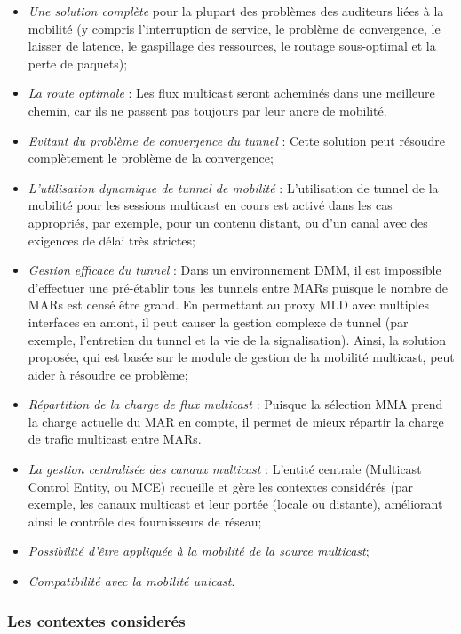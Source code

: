 \begin{itemize}
\item \textit{Une solution complète} pour la plupart des problèmes des auditeurs liées à la mobilité (y compris l'interruption de service, le problème de convergence, le laisser de latence, le gaspillage des ressources, le routage sous-optimal et la perte de paquets);
\item \textit{La route optimale} : Les flux multicast seront acheminés dans une meilleure chemin, car ils ne passent pas toujours par leur ancre de mobilité.
\item \textit{Evitant du problème de convergence du tunnel} : Cette solution peut résoudre complètement le problème de la convergence;
\item \textit{L'utilisation dynamique de tunnel de mobilité} : L'utilisation de tunnel de la mobilité pour les sessions multicast en cours est activé dans les cas appropriés, par exemple, pour un contenu distant, ou d'un canal avec des exigences de délai très strictes;

\item \textit{Gestion efficace du tunnel} : Dans un environnement DMM, il est impossible d'effectuer une pré-établir tous les tunnels entre MARs puisque le nombre de MARs est censé être grand. En permettant au proxy MLD avec multiples interfaces en amont, il peut causer la gestion complexe de tunnel (par exemple, l'entretien du tunnel et la vie de la signalisation). Ainsi, la solution proposée, qui est basée sur le module de gestion de la mobilité multicast, peut aider à résoudre ce problème;

\item \textit{Répartition de la charge de flux multicast} : Puisque la sélection MMA prend la charge actuelle du MAR en compte, il permet de mieux répartir la charge de trafic multicast entre MARs.
\item \textit{La gestion centralisée des canaux multicast} : L'entité centrale (Multicast Control Entity, ou MCE) recueille et gère les contextes considérés (par exemple, les canaux multicast et leur portée (locale ou distante), améliorant ainsi le contrôle des fournisseurs de réseau;
\item \textit{Possibilité d'être appliquée à la mobilité de la source multicast};
\item \textit{Compatibilité avec la mobilité unicast}.
\end{itemize}

\subsubsection{Les contextes considerés}
